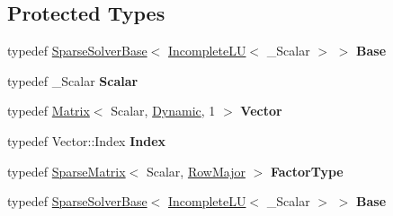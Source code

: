 \subsection*{Protected Types}
\begin{DoxyCompactItemize}
\item 
\mbox{\label{class_eigen_1_1_incomplete_l_u_a8854a1d2992836bcd86dba9a145cc262}} 
typedef \hyperlink{group___sparse_core___module_class_eigen_1_1_sparse_solver_base}{Sparse\+Solver\+Base}$<$ \hyperlink{class_eigen_1_1_incomplete_l_u}{Incomplete\+LU}$<$ \+\_\+\+Scalar $>$ $>$ {\bfseries Base}
\item 
\mbox{\label{class_eigen_1_1_incomplete_l_u_a10419a3510132ea46c4df71326bcc8c2}} 
typedef \+\_\+\+Scalar {\bfseries Scalar}
\item 
\mbox{\label{class_eigen_1_1_incomplete_l_u_a0e332559b3c5d785d80cebae73c1ac0a}} 
typedef \hyperlink{group___core___module_class_eigen_1_1_matrix}{Matrix}$<$ Scalar, \hyperlink{namespace_eigen_ad81fa7195215a0ce30017dfac309f0b2}{Dynamic}, 1 $>$ {\bfseries Vector}
\item 
\mbox{\label{class_eigen_1_1_incomplete_l_u_a5be4d5cde2ce2510a575865bd468cf77}} 
typedef Vector\+::\+Index {\bfseries Index}
\item 
\mbox{\label{class_eigen_1_1_incomplete_l_u_a0ffdb69e64c341b048e41a5e72e96ddd}} 
typedef \hyperlink{group___sparse_core___module_class_eigen_1_1_sparse_matrix}{Sparse\+Matrix}$<$ Scalar, \hyperlink{group__enums_ggaacded1a18ae58b0f554751f6cdf9eb13acfcde9cd8677c5f7caf6bd603666aae3}{Row\+Major} $>$ {\bfseries Factor\+Type}
\item 
\mbox{\label{class_eigen_1_1_incomplete_l_u_a8854a1d2992836bcd86dba9a145cc262}} 
typedef \hyperlink{group___sparse_core___module_class_eigen_1_1_sparse_solver_base}{Sparse\+Solver\+Base}$<$ \hyperlink{class_eigen_1_1_incomplete_l_u}{Incomplete\+LU}$<$ \+\_\+\+Scalar $>$ $>$ {\bfseries Base}
\item 
\mbox{\label{class_eigen_1_1_incomplete_l_u_a10419a3510132ea46c4df71326bcc8c2}} 

\end{DoxyCompactItemize}
